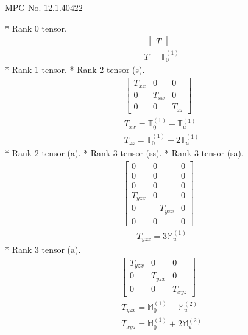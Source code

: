 \documentclass[fleqn,8pt,landscape]{jsarticle}
\begin{document}
\setcounter{MaxMatrixCols}{32}

\renewcommand{\tablename}{Table~}
\renewcommand{\figurename}{Figure~}
\begin{center}
\LARGE
MPG No. 12.1.40\quad$422$
\end{center}
* Rank 0 tensor.
\begin{align*}
\begin{bmatrix} T \end{bmatrix}
\end{align*}
\begin{align*}
& T = \mathbb{T}_{0}^{(1)}
\end{align*}
* Rank 1 tensor.
* Rank 2 tensor (s).
\begin{align*}
\begin{bmatrix} T_{xx} & 0 & 0 \\ 0 & T_{xx} & 0 \\ 0 & 0 & T_{zz} \end{bmatrix}
\end{align*}
\begin{align*}
& T_{xx} = \mathbb{T}_{0}^{(1)} - \mathbb{T}_{u}^{(1)} \\
& T_{zz} = \mathbb{T}_{0}^{(1)} + 2 \mathbb{T}_{u}^{(1)}
\end{align*}
* Rank 2 tensor (a).
* Rank 3 tensor (ss).
* Rank 3 tensor (sa).
\begin{align*}
\begin{bmatrix} 0 & 0 & 0 \\ 0 & 0 & 0 \\ 0 & 0 & 0 \\ T_{yzx} & 0 & 0 \\ 0 & - T_{yzx} & 0 \\ 0 & 0 & 0 \end{bmatrix}
\end{align*}
\begin{align*}
& T_{yzx} = 3 \mathbb{M}_{u}^{(1)}
\end{align*}
* Rank 3 tensor (a).
\begin{align*}
\begin{bmatrix} T_{yzx} & 0 & 0 \\ 0 & T_{yzx} & 0 \\ 0 & 0 & T_{xyz} \end{bmatrix}
\end{align*}
\begin{align*}
& T_{yzx} = \mathbb{M}_{0}^{(1)} - \mathbb{M}_{u}^{(2)} \\
& T_{xyz} = \mathbb{M}_{0}^{(1)} + 2 \mathbb{M}_{u}^{(2)}
\end{align*}
\end{document}
